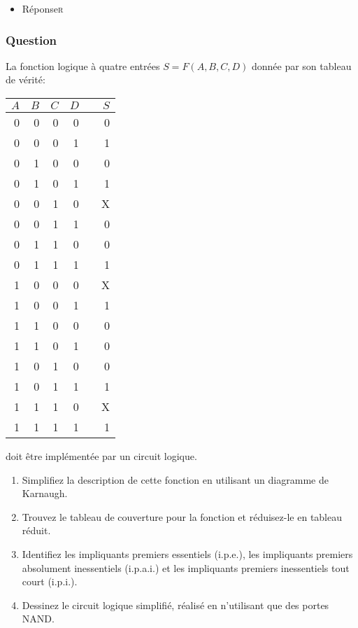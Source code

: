 \documentclass[11pt]{article}
\begin{document}
\begin{itemize}
\item Réponse\hfill{}\textsc{r}
\label{sec:org679a1d3}
\end{itemize}

\subsubsection*{Question}
\label{sec:orge89aacb}
La fonction logique à quatre entrées \(S = F(A,B,C, D)\) donnée par son 
  tableau de vérité:
\begin{center}
\begin{tabular}{rrrrlr}
\(A\) & \(B\) & \(C\) & \(D\) &  & \(S\)\\
\hline
0 & 0 & 0 & 0 &  & 0\\
0 & 0 & 0 & 1 &  & 1\\
0 & 1 & 0 & 0 &  & 0\\
0 & 1 & 0 & 1 &  & 1\\
0 & 0 & 1 & 0 &  & X\\
0 & 0 & 1 & 1 &  & 0\\
0 & 1 & 1 & 0 &  & 0\\
0 & 1 & 1 & 1 &  & 1\\
1 & 0 & 0 & 0 &  & X\\
1 & 0 & 0 & 1 &  & 1\\
1 & 1 & 0 & 0 &  & 0\\
1 & 1 & 0 & 1 &  & 0\\
1 & 0 & 1 & 0 &  & 0\\
1 & 0 & 1 & 1 &  & 1\\
1 & 1 & 1 & 0 &  & X\\
1 & 1 & 1 & 1 &  & 1\\
\end{tabular}
\end{center}
doit être implémentée par un circuit logique.

\begin{enumerate}
\item Simplifiez la description de cette fonction en utilisant un diagramme de Karnaugh.

\item Trouvez le tableau de couverture pour la fonction et réduisez-le en tableau réduit.

\item Identifiez les impliquants premiers essentiels (i.p.e.), les
impliquants premiers absolument inessentiels (i.p.a.i.) et les
impliquants premiers inessentiels tout court (i.p.i.).

\item Dessinez le circuit logique simplifié, réalisé en n'utilisant que des portes NAND.
\end{enumerate}
\end{document}
